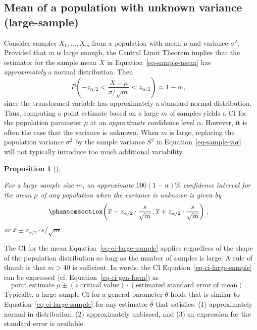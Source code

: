 \documentclass[
  a4paper,
  DIV=11,
  numbers=noendperiod,
  oneside]{scrreprt}
\theoremstyle{definition}
\theoremstyle{definition}
\theoremstyle{plain}
\newtheorem{proposition}{Proposition}[chapter]
\theoremstyle{plain}
\theoremstyle{definition}
\theoremstyle{remark}
\begin{document}
\subsection{Mean of a population with unknown variance
(large-sample)}\label{sec-mean-large-sample}

Consider samples \(X_1, \dots, X_m\) from a population with mean \(\mu\)
and variance \(\sigma^2.\) Provided that \(m\) is large enough, the
Central Limit Theorem implies that the estimator for the sample mean
\(\overline{X}\) in Equation~\ref{eq-sample-mean} has
\emph{approximately} a normal distribution. Then \[
P \left( - z_{\alpha/2} < \frac{\overline{X} - \mu}{\sigma/\sqrt{m}} < z_{\alpha/2} \right) \approx 1 - \alpha\,,
\] since the transformed variable has approximately a standard normal
distribution. Thus, computing a point estimate based on a large \(m\) of
samples yields a CI for the population parameter \(\mu\) at an
\emph{approximate} confidence level \(\alpha.\) However, it is often the
case that the variance is unknown. When \(m\) is large, replacing the
population variance \(\sigma^2\) by the sample variance \(S^2\) in
Equation~\ref{eq-sample-var} will not typically introduce too much
additional variability.

\begin{proposition}[]\protect\hypertarget{prp-ci-large-sample}{}\label{prp-ci-large-sample}

For a large sample size \(m\), an approximate \(100(1-\alpha)\%\)
confidence interval for the mean \(\mu\) of any population when the
variance is unknown is given by
\begin{equation}\phantomsection\label{eq-ci-large-sample}{
 \left(\overline{x} - z_{\alpha/2} \cdot \frac{s}{\sqrt{m}} \,, 
        \overline{x} + z_{\alpha/2} \cdot \frac{s}{\sqrt{m}} \right)\,,  
}\end{equation} or \(\overline{x} \pm z_{\alpha/2} \cdot s / \sqrt{m}.\)

\end{proposition}

The CI for the mean Equation~\ref{eq-ci-large-sample} applies regardless
of the shape of the population distribution so long as the number of
samples is large. A rule of thumb is that \(m > 40\) is sufficient. In
words, the CI Equation~\ref{eq-ci-large-sample} can be expressed (cf.
Equation~\ref{eq-ci-gen-form}) as \[
 \text{point estimate}\; \mu \pm 
 (z \;\text{critical value}) \cdot (\text{estimated standard error of mean})\,.
\] Typically, a large-sample CI for a general parameter \(\theta\) holds
that is similar to Equation~\ref{eq-ci-large-sample} for any estimator
\(\widehat{\theta}\) that satisfies: (1) approximately normal in
distribution, (2) approximately unbiased, and (3) an expression for the
standard error is available.
\end{document}
